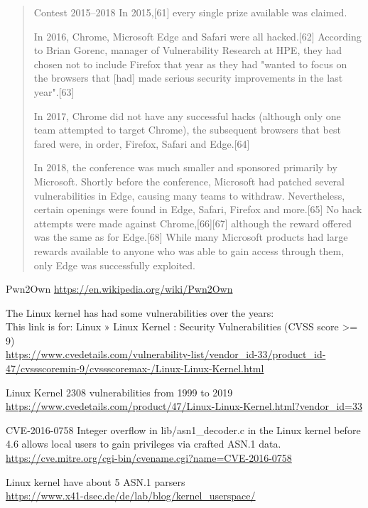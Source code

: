 \documentclass[Screen16to9,17pt]{foils}
\begin{document}

\begin{quote}
Contest 2015–2018
In 2015,[61] every single prize available was claimed.

In 2016, Chrome, Microsoft Edge and Safari were all hacked.[62] According to Brian Gorenc, manager of Vulnerability Research at HPE, they had chosen not to include Firefox that year as they had "wanted to focus on the browsers that [had] made serious security improvements in the last year".[63]

In 2017, Chrome did not have any successful hacks (although only one team attempted to target Chrome), the subsequent browsers that best fared were, in order, Firefox, Safari and Edge.[64]

In 2018, the conference was much smaller and sponsored primarily by Microsoft. Shortly before the conference, Microsoft had patched several vulnerabilities in Edge, causing many teams to withdraw. Nevertheless, certain openings were found in Edge, Safari, Firefox and more.[65] No hack attempts were made against Chrome,[66][67] although the reward offered was the same as for Edge.[68] While many Microsoft products had large rewards available to anyone who was able to gain access through them, only Edge was successfully exploited.
\end{quote}

Pwn2Own
\url{https://en.wikipedia.org/wiki/Pwn2Own}



The Linux kernel has had some vulnerabilities over the years:\\
This link is for: Linux » Linux Kernel : Security Vulnerabilities (CVSS score >= 9)\\

{\footnotesize\url{https://www.cvedetails.com/vulnerability-list/vendor_id-33/product_id-47/cvssscoremin-9/cvssscoremax-/Linux-Linux-Kernel.html}}

Linux Kernel 2308 vulnerabilities from 1999 to 2019\\
\url{https://www.cvedetails.com/product/47/Linux-Linux-Kernel.html?vendor_id=33}


\begin{list2}
\item CVE-2016-0758 Integer overflow in lib/asn1\_decoder.c in the Linux kernel before 4.6 allows local users to gain privileges via crafted ASN.1 data.\\
\url{https://cve.mitre.org/cgi-bin/cvename.cgi?name=CVE-2016-0758}
\item Linux kernel have about 5 ASN.1 parsers\\
\url{https://www.x41-dsec.de/de/lab/blog/kernel_userspace/}
\end{list2}
\end{document}
